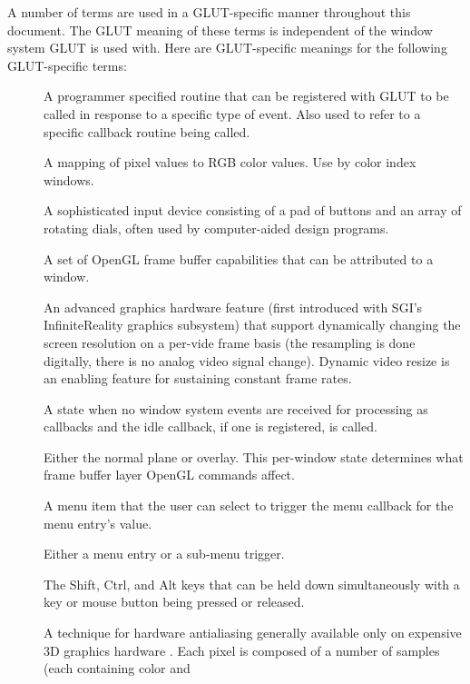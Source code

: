 \documentclass[titlepage,twoside]{article}
\begin{document}
A number of terms are used in a GLUT-specific manner throughout this
document.  The GLUT meaning of these terms is independent of the
window system GLUT is used with.  Here are GLUT-specific
meanings for the following GLUT-specific terms:
\begin{description}
\item[{\em {}}]  A programmer specified routine that can be
registered with GLUT to be called in response to a specific type
of event.  Also used to refer to a specific callback routine
being called.
\item[{\em {}}]  A mapping of pixel values to RGB color values.
  Use by color index windows.
\item[{\em {}}]  A sophisticated input device
consisting of a pad of buttons and an array of rotating dials, often
used by computer-aided design programs.
\item[{\em {}}]  A set of OpenGL frame buffer capabilities
that can be attributed to a window.
\item[{\em {}}]  An advanced graphics hardware
feature (first introduced with SGI's InfiniteReality graphics subsystem)
that support dynamically changing the screen resolution on a per-vide
frame basis (the resampling is done digitally, there is no analog video
signal change).  Dynamic video resize is an enabling feature for sustaining
constant frame rates.
\item[{\em {}}]  A state when no window system events are received
for processing as callbacks and the idle callback, if one is registered,
is called.
\item[{\em {}}]  Either the normal plane or overlay.  This
per-window state determines what frame buffer layer OpenGL commands affect.
\item[{\em {}}]  A menu item that the user can select to
trigger the menu callback for the menu entry's value.
\item[{\em {}}]  Either a menu entry or a sub-menu trigger.
\item[{\em {}}]  The Shift, Ctrl, and Alt keys that can be held down
simultaneously with a key or mouse button being pressed or released.
\item[{\em {}}]  A technique for hardware antialiasing
generally available only on expensive 3D graphics hardware \cite{akeley93}.  Each
pixel is composed of a number of samples (each containing color and

\end{description}
\end{document}
